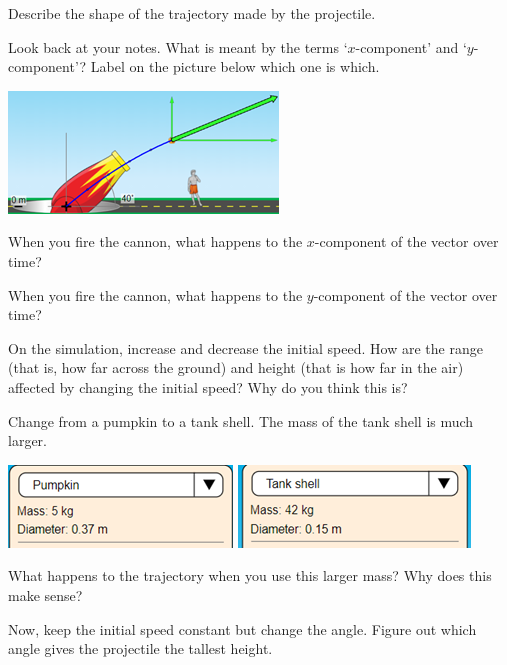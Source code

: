 \documentclass[10pt]{exam}
\begin{document}
\begin{questions}
  \question
    Describe the shape of the trajectory made by the projectile.\vs

  \question
    Look back at your notes.  What is meant by the terms `$x$-component' and `$y$-component'?  Label on the picture below which one is which.

    \includegraphics{xy.png}
    \vspace{2em}

  \question
    When you fire the cannon, what happens to the $x$-component of the vector over time? \vs
    
    
  \question
    When you fire the cannon, what happens to the $y$-component of the vector over time? \vs


    
  \question
    On the simulation, increase and decrease the initial speed. How are the range (that is, how far across the ground) and height (that is how far in the air) affected by changing the initial speed? Why do you think this is? \vs
    
  \pagebreak

  \question
    Change from a pumpkin to a tank shell.  The mass of the tank shell is much larger.  

    \includegraphics{pumpkin.png} \includegraphics{tankshell.png}
      
    What happens to the trajectory when you use this larger mass?  Why does this make sense? \vs[2]
    
   \question
    Now, keep the initial speed constant but change the angle.  Figure out which angle gives the projectile the tallest height.
    

\end{questions}
\end{document}
